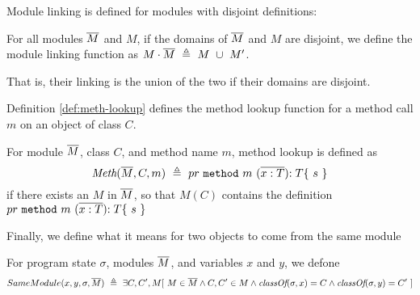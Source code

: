 Module linking is defined for modules with disjoint definitions:

\begin{definition}
\label{def:linking}
For all modules $\overline{M}$ and $M$, if the domains of $\overline{M}$ and $M$ are disjoint, 
we define the module linking function as $M\cdot \overline{M}\ \triangleq\ M\ \cup\ M'$.
\end{definition}
That is,  their linking is the union of the two if their domains are disjoint.

Definition \ref{def:meth-lookup} defines the method lookup function for a method
call $m$ on an object of class $C$.
\begin{definition}
\label{def:meth-lookup}
For module $\overline{M}$, class $C$, and method name $m$, method lookup is defined as 
$$\textit{Meth}(\overline{M}, C, m)\ \triangleq\ { pr}\  \mbox{\normalfont{\texttt{method}}}\ m\ (\overline{x : T}) {:T}\{\ s\ \}  $$
if there exists an $M$ in $\overline{M}$, so that $M(C)$ contains the definition ${ pr}\  \prg{method}\ m\ (\overline{x : T}) {:T}\{\ s\ \} $
\end{definition}



\newcommand{\Same}[4]{{SameModule(#1,#2,#3,#4)}}

Finally, we define what it means for two objects to come from the same module
\begin{definition}
\label{def:class-lookup}
For program state $\sigma$,  modules $\overline{M}$, and variables $x$ and $y$, we defone
$$\Same {x} {y} {\sigma}{\Mtwo}\ \triangleq\ \exists C, C', M[ \ M\in \Mtwo \wedge C, C'\in M \wedge  \class{\sigma}{x}=C \wedge \class{\sigma}{y} =C'\ ]$$
\end{definition}


